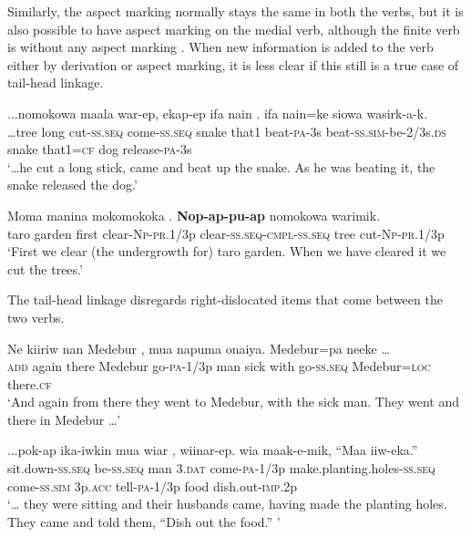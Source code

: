  Similarly, the aspect marking normally stays the same in both the verbs, but it is also possible to have aspect marking on the medial verb, although the finite verb is without any aspect marking . When new information is added to the verb either by derivation or aspect marking, it is less clear if this still is a true case of tail-head linkage.  

\ea%
\label{ex:8:x1516}
\gll ...nomokowa  maala  war-ep,  ekap-ep  ifa  nain .    ifa  nain=ke siowa  wasirk-a-k.\\
{\dots}tree  long  cut-\textsc{ss}.\textsc{seq} come-\textsc{ss}.\textsc{seq} snake  that1 beat-\textsc{pa}-3s beat-\textsc{ss}.\textsc{sim}-be-2/3s.\textsc{ds} snake  that1=\textsc{cf} dog  release-\textsc{pa}-3s\\
\glt`{\dots}he cut a long stick, came and beat up the snake. As he was beating it, the snake released the dog.'
\z


\ea%
\label{ex:8:x1517}
\gll Moma  manina  mokomokoka  \textstyleEmphasizedVernacularWords{-}\textstyleEmphasizedVernacularWords{-}. \textbf{Nop}\textbf{-}\textbf{ap-pu}\textbf{-}\textbf{ap}  nomokowa  warimik. \\
taro  garden  first  clear-\textsc{Np}-\textsc{pr}.1/3p clear-\textsc{ss}.\textsc{seq}-\textsc{cmpl}-\textsc{ss}.\textsc{seq} tree cut-\textsc{Np}-\textsc{pr}.1/3p     \\
\glt`First we clear (the undergrowth for) taro garden. When we have cleared it we cut the trees.'
\z
{}


The tail-head linkage disregards right-dislocated items that come between the two verbs. 

\ea%
\label{ex:8:x1518}
\gll Ne  kiiriw  nan  Medebur  ,  mua  napuma  onaiya.   Medebur=pa  neeke  {\dots}\\
\textsc{add} again  there  Medebur go-\textsc{pa}-1/3p  man  sick  with go-\textsc{ss}.\textsc{seq} Medebur=\textsc{loc} there.\textsc{cf}\\
\glt`And again from there they went to Medebur, with the sick man. They went and there in Medebur {\dots}'
\z


\ea%
\label{ex:8:x1519}
\gll ...pok-ap  ika-iwkin  mua  wiar  , wiinar-ep.    wia  maak-e-mik, ``Maa  iiw-eka.'' \\
sit.down-\textsc{ss}.\textsc{seq} be-\textsc{ss}.\textsc{seq} man  3.\textsc{dat} come-\textsc{pa}-1/3p make.planting.holes-\textsc{ss}.\textsc{seq} come-\textsc{ss}.\textsc{sim} 3p.\textsc{acc} tell-\textsc{pa}-1/3p food dish.out-\textsc{imp}.2p\\
\glt`{\dots} they were sitting and their husbands came, having made the planting holes. They came and told them, ``Dish out the food.'' '
\z


